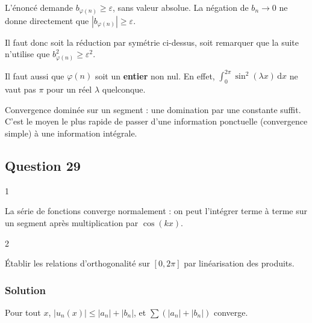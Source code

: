 \documentclass[11pt,a4paper]{article}
\begin{document}
\begin{piege}

L'énoncé demande \(b_{\varphi(n)}\geqslant\varepsilon\), sans valeur absolue. La négation de \(b_n\to0\) ne donne directement que \(|b_{\varphi(n)}|\geqslant\varepsilon\).

Il faut donc soit la réduction par symétrie ci-dessus, soit remarquer que la suite n'utilise que \(b_{\varphi(n)}^2\geqslant\varepsilon^2\).

Il faut aussi que \(\varphi(n)\) soit un \textbf{entier} non nul. En effet, \(\int_0^{2\pi}\sin^2(\lambda x)\,\mathrm dx\) ne vaut pas \(\pi\) pour un réel \(\lambda\) quelconque.

\end{piege}

\begin{methode}

Convergence dominée sur un segment : une domination par une constante suffit. C'est le moyen le plus rapide de passer d'une information ponctuelle (convergence simple) à une information intégrale.

\end{methode}

\hypertarget{question-29}{%
\subsection{Question 29}\label{question-29}}

\begin{indication}{1}

La série de fonctions converge normalement : on peut l'intégrer terme à terme sur un segment après multiplication par \(\cos(kx)\).

\end{indication}

\begin{indication}{2}

Établir les relations d'orthogonalité sur \([0,2\pi]\) par linéarisation des produits.

\end{indication}

\hypertarget{solution-28}{%
\subsubsection{Solution}\label{solution-28}}

Pour tout \(x\), \(|u_n(x)|\leqslant|a_n|+|b_n|\), et \(\sum(|a_n|+|b_n|)\) converge.
\end{document}
